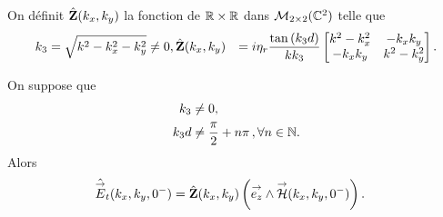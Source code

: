         \begin{defn}
          \label{def:plan:impedance:1c}
          On définit \(\hat {\mathbf{Z}}(k_x,k_y)\) la fonction de \(\mathbb R \times \mathbb R\) dans \(\mathcal{M}_{2\times2}(\mathbb C^2)\) telle que
          \begin{align*}
            k_3 &= \sqrt{k^2 - k_x^2 -k_y^2} \not = 0,
            \hat {\mathbf{Z}}(k_x,k_y) &= i\eta_r\dfrac{\tan\left(k_3d\right)}{k k_3}
            \begin{bmatrix}
              k^2-k_x^2  & -k_xk_y
              \\
              -k_xk_y & k^2-k_y^2
            \end{bmatrix}.
          \end{align*}
        \end{defn}
        \begin{prop}
            \label{prop:imp_plan:symb_z:1c}
            On suppose que
            \begin{align*}
                k_3     & \not = 0, \\
                k_3d    & \not = \dfrac{\pi}{2}+n\pi\,, \forall n \in \mathbb N.
            \end{align*}
            Alors
            \begin{align*}
              \hat {{\overset{\rightarrow}{E}}}_t(k_x,k_y,0^-) &= \hat {\mathbf{Z}}(k_x,k_y) \left({\overset{\rightarrow}{e_z}} \wedge {\overset{\rightarrow}{\mathcal{H}}}(k_x,k_y,0^-)\right).
            \end{align*}
        \end{prop}

